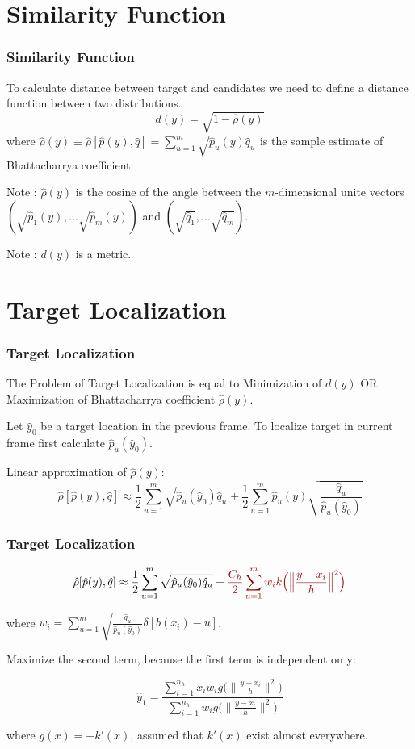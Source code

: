 \documentclass[hyperref={pdfpagelabels=false}]{beamer}
\begin{document}
\section{Similarity Function}
\begin{frame}
\frametitle{Similarity Function}
To calculate distance between target and candidates we need to define {\color{darkred} a distance function between two distributions}.
\pause
	$$d(y) = \sqrt{1-\hat{\rho}(y)}$$
where $\hat{\rho}(y) \equiv \hat{\rho}[\hat{p}(y), \hat{q}] = \sum_{u=1}^{m}\sqrt{\hat{p}_u(y) \hat{q}_u}$ is the sample estimate of {\color{darkred} Bhattacharrya coefficient}.

\pause
{\color{darkred} Note} : $\hat{\rho}(y)$ is the cosine of the angle between the $m$-dimensional unite vectors $(\sqrt{\hat{p}_1(y)},\dots \sqrt{\hat{p}_m(y)})$ and $(\sqrt{\hat{q}_1},\dots \sqrt{\hat{q}_m})$. 

\pause
{\color{darkred} Note} : $d(y)$ is a metric.

\end{frame}

\section{Target Localization}
\begin{frame}
\frametitle{Target Localization}
The Problem of Target Localization is equal to {\color{darkred} Minimization of $d(y)$} OR {\color{darkred} Maximization of Bhattacharrya coefficient} $\hat{\rho}(y)$.

\vspace{10pt}
Let $\hat{y}_0$ be a target location in the previous frame. To localize target in current frame first calculate $\hat{p}_u(\hat{y}_0)$.

\vspace{10pt}
Linear approximation of $\hat{\rho}(y)$: 
$$\hat{\rho}[\hat{p}(y), \hat{q}] \approx \frac{1}{2}\sum_{u=1}^{m}\sqrt{\hat{p}_u(\hat{y}_0) \hat{q}_u}+\frac{1}{2}\sum_{u=1}^{m}\hat{p}_u(y)\sqrt{\frac{\hat{q}_u}{\hat{p}_u(\hat{y}_0)}}$$

\end{frame}


\begin{frame}
\frametitle{Target Localization}

$$\hat{\rho}[\hat{p}(y), \hat{q}] \approx \frac{1}{2}\sum_{u=1}^{m}\sqrt{\hat{p}_u(\hat{y}_0) \hat{q}_u}+\color{darkred}\frac{C_h}{2}\sum_{u=1}^{m}w_i k\Big(\Big\lVert\frac{ y-x_i}{h}\Big\rVert^2\Big)$$

where $w_i = \sum_{u=1}^{m}\sqrt{\frac{\hat{q}_u}{\hat{p}_u(\hat{y}_0)}}\delta[b(x_i)-u]$.

Maximize the second term, because the first term is independent on y:

$$\hat{y}_1 = \frac{\sum_{i=1}^{n_h}x_iw_ig\Big(\Big\lVert\frac{ y-x_i}{h}\Big\rVert^2\Big)}{\sum_{i=1}^{n_h}w_ig\Big(\Big\lVert\frac{ y-x_i}{h}\Big\rVert^2\Big)}$$

where $g(x) = -k'(x)$, assumed that $k'(x)$ exist almost everywhere.

\end{frame}
\end{document}
